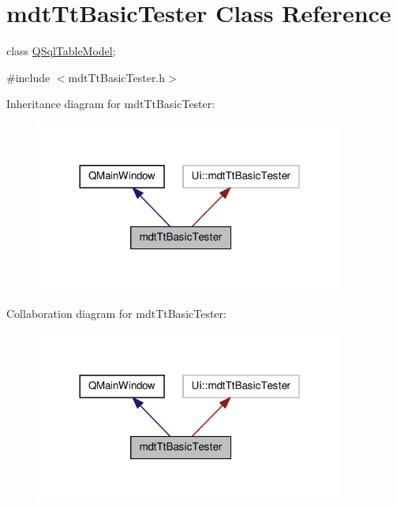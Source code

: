 \hypertarget{classmdt_tt_basic_tester}{\section{mdt\-Tt\-Basic\-Tester Class Reference}
\label{classmdt_tt_basic_tester}
}


class \hyperlink{class_q_sql_table_model}{Q\-Sql\-Table\-Model};  




{\ttfamily \#include $<$mdt\-Tt\-Basic\-Tester.\-h$>$}



Inheritance diagram for mdt\-Tt\-Basic\-Tester\-:\nopagebreak
\begin{figure}[H]
\begin{center}
\leavevmode
\includegraphics[width=288pt]{classmdt_tt_basic_tester__inherit__graph}
\end{center}
\end{figure}


Collaboration diagram for mdt\-Tt\-Basic\-Tester\-:\nopagebreak
\begin{figure}[H]
\begin{center}
\leavevmode
\includegraphics[width=288pt]{classmdt_tt_basic_tester__coll__graph}
\end{center}
\end{figure}
